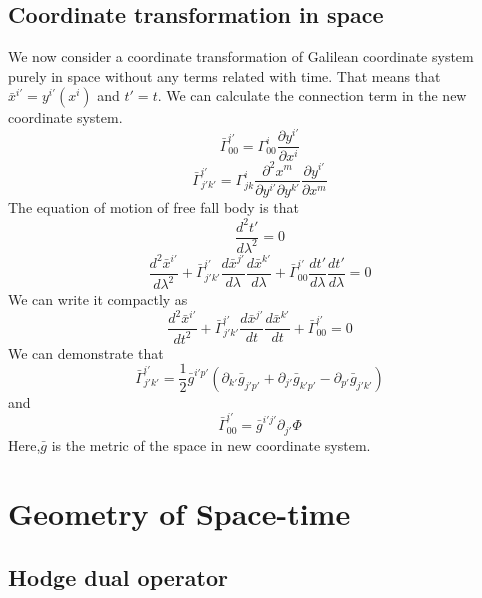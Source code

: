 \section{Coordinate transformation in space}
\noindent
We now consider a coordinate transformation of Galilean coordinate system purely in space without any terms related with time. That means that $\bar{x}^{i'} = y^{i'}(x^{i})$ and $t'=t$. We can calculate the connection term in the new coordinate system.
\[\bar{\Gamma}^{i'}_{00} = \Gamma^{i}_{00} \frac{\partial y^{i'}}{\partial x^{i}}\]
\[\bar{\Gamma}^{i'}_{j'k'} = \Gamma^{i}_{jk} \frac{\partial^2 x^{m}}{\partial y^{i'}\partial y^{k'}} \frac{\partial y^{i'}}{\partial x^{m}}\]
The equation of motion of free fall body is that
\[\frac{d^2 t'}{d\lambda^2} = 0\]
\[\frac{d^2 \bar{x}^{i'}}{d\lambda^2} + \bar{\Gamma}^{i'}_{j' k'} \frac{d\bar{x}^{j'}}{d \lambda} \frac{d\bar{x}^{k'}}{d \lambda} + \bar{\Gamma}^{i'}_{0 0} \frac{dt'}{d \lambda} \frac{dt'}{d \lambda}=0\]
We can write it compactly as 
\[\frac{d^2 \bar{x}^{i'}}{dt^2} + \bar{\Gamma}^{i'}_{j' k'} \frac{d\bar{x}^{j'}}{dt} \frac{d\bar{x}^{k'}}{dt} + \bar{\Gamma}^{i'}_{0 0}=0\]
We can demonstrate that
\[\bar{\Gamma}^{i'}_{j'k'} = \frac{1}{2} \bar{g}^{i'p'}(\partial_{k'}\bar{g}_{j'p'}+\partial_{j'}\bar{g}_{k'p'}-\partial_{p'}\bar{g}_{j'k'})\]
and
\[\bar{\Gamma}^{i'}_{00} = \bar{g}^{i'j'}\partial_{j'}\Phi\]
Here,$\bar{g}$ is the metric of the space in new coordinate system.

\chapter{Geometry of Space-time}
\section{Hodge dual operator}

